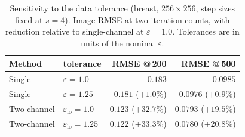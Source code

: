 \documentclass{article}
\begin{document}
\begin{table}[t]
\centering
\caption{Sensitivity to the data tolerance (breast, $256\times256$, step sizes fixed at $s=4$). Image RMSE at two iteration counts, with reduction relative to single-channel at $\varepsilon=1.0$. Tolerances are in units of the nominal $\varepsilon$.}
\label{tab:eps}
\begin{tabular}{llrr}
\toprule
Method & tolerance & RMSE @\,200 & RMSE @\,500\\
\midrule
Single & $\varepsilon=1.0$ & $0.183$ & $0.0985$\\
Single & $\varepsilon=1.25$ & $0.181$ ($+1.0\%$) & $0.0976$ ($+0.9\%$)\\
Two-channel & $\varepsilon_{\mathrm{lo}}=1.0$ & $0.123$ ($+32.7\%$) & $0.0793$ ($+19.5\%$)\\
Two-channel & $\varepsilon_{\mathrm{lo}}=1.25$ & $0.122$ ($+33.3\%$) & $0.0780$ ($+20.8\%$)\\
\bottomrule
\end{tabular}
\end{table}



\end{document}
